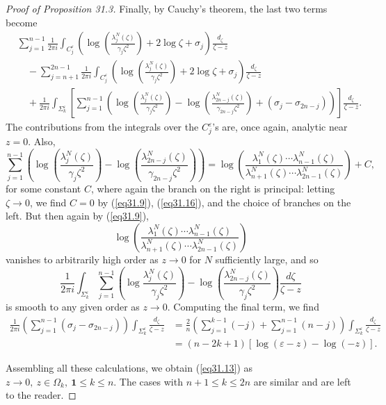\documentclass{surv-l}
\theoremstyle{plain}
\theoremstyle{definition}
\numberwithin{equation}{chapter}
\begin{document}
\begin{proof}[Proof of Proposition 31.3]
Finally, by Cauchy's theorem, the last two terms become
\begin{align*}
&\sum_{j=1}^{n-1}\frac{1}{2\pi i}\int_{C_{j}^{\varepsilon}}\left(\log\left(\frac{\lambda_{j}^{N}(\zeta)}{\gamma_{j}\zeta^{2}}\right)+2\log\zeta+\sigma_{j}\right)\frac{d_{\zeta}}{\zeta-z}\\ \nonumber
&\quad -\sum_{j=n+1}^{2n-1}\frac{1}{2\pi i}\int_{C_{j}^{\varepsilon}}\left(\log\left(\frac{\lambda_{j}^{N}(\zeta)}{\gamma_{j}\zeta^{2}}\right) +2\log\zeta+\sigma_{j}\right)\frac{d_{\zeta}}{\zeta-z}\\ \nonumber
&\quad +\frac{1}{2\pi i}\int_{\Sigma_{k}^{\varepsilon}}\left[\sum_{j=1}^{n-1}\left(\log\left(\frac{\lambda_{j}^{N}(\zeta)}{\gamma_{j}\zeta^{2}}\right)-\log\left(\frac{\lambda_{2n-j}^{N}(\zeta)}{\gamma_{2n-j}\zeta^{2}}\right) +(\sigma_{j}-\sigma_{2n-j})\right)\right]\frac{d_{\zeta}}{\zeta-z}.
\end{align*}
The contributions from the integrals over the $C_{j}^{\varepsilon}$'s are, once again, analytic near $z=0$. Also,
\begin{equation*}
 \sum_{j=1}^{n-1}\left(\log\left(\frac{\lambda_{j}^{N}(\zeta)}{\gamma_{j}\zeta^{2}}\right)-\log\left(\frac{\lambda_{2n-j}^{N}(\zeta)}{\gamma_{2n-j}\zeta^{2}}\right)\right)=\log\left(\frac{\lambda_{1}^{N}(\zeta)\cdots\lambda_{n-1}^{N}(\zeta)}{\lambda_{n+1}^{N}(\zeta)\cdots\lambda_{2n-1}^{N}(\zeta)}\right)+C,
 \end{equation*}
for some constant $C$, where again the branch on the right is principal: letting $\zeta\rightarrow 0$, we find $C=0$ by (\ref{eq31.9}), (\ref{eq31.16}), and the choice of branches on the left. But then again by (\ref{eq31.9}),
\begin{equation*}
\log\left(\frac{\lambda_{1}^{N}(\zeta)\cdots\lambda_{n-1}^{N}(\zeta)}{\lambda_{n+1}^{N}
(\zeta)\cdots\lambda_{2n-1}^{N}(\zeta)}\right)
\end{equation*}
vanishes to arbitrarily high order as $z\rightarrow 0$ for $N$ sufficiently large, and so
\begin{equation*}
\frac{1}{2\pi i}\int_{\Sigma_{k}^{\varepsilon}}\sum_{j=1}^{n-1}\left(\log\frac{\lambda_{j}^{N}(\zeta)}{\gamma_{j}\zeta^{2}}\right)-\log\left(\frac{\lambda_{2n-j}^{N}(\zeta)}{\gamma_{j}\zeta^{2}}\right)\frac{d{\zeta}}{\zeta-z}
\end{equation*}
is smooth to any given order as $z\rightarrow 0$. Computing the final term, we find
\begin{align*}
 \frac{1}{2\pi i}\left(\sum_{j=1}^{n-1}(\sigma_{j}-\sigma_{2n-j})\right)\int_{\Sigma_{k}^{\varepsilon}}\frac{d_{\zeta}}{\zeta-z}&=\frac{2}{n}\left(\sum_{j=1}^{k-1}(-j)+\sum_{j=1}^{n-1}(n-j)\right)\int_{\Sigma_{k}^{\varepsilon}}\frac{d_{\zeta}}{\zeta-z}\\ \nonumber
&=(n-2k+1)[\log(\varepsilon-z)-\log(-z)].
\end{align*}

Assembling all these calculations, we obtain (\ref{eq31.13}) as $z\rightarrow 0,\ z\in\Omega_{k},\  \mathbf{1}\leq k\leq n$. The cases with $n+1\leq k\leq 2n$ are similar and are left to the reader. \quad {}
\end{proof}
\end{document}
